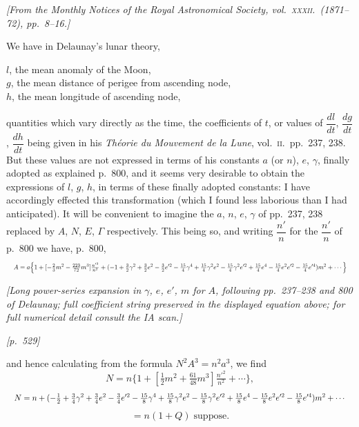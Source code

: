 \documentclass[11pt]{article}
\begin{document}
\medskip

\noindent\textit{[From the Monthly Notices of the Royal Astronomical
Society, vol.~\textsc{xxxii}.\ (1871--72), pp.~8--16.]}

\bigskip

We have in Delaunay's lunar theory,

\smallskip

\indent $l$, the mean anomaly of the Moon,\\
\indent $g$, the mean distance of perigee from ascending node,\\
\indent $h$, the mean longitude of ascending node,

\smallskip

quantities which vary directly as the time, the coefficients of $t$, or
values of $\dfrac{dl}{dt}$, $\dfrac{dg}{dt}$, $\dfrac{dh}{dt}$ being
given in his \textit{Th\'eorie du Mouvement de la Lune}, vol.~\textsc{ii}.\
pp.~237, 238. But these values are not expressed in terms of his
constants $a$ (or $n$), $e$, $\gamma$, finally adopted as explained
p.~800, and it seems very desirable to obtain the expressions of $l$,
$g$, $h$, in terms of these finally adopted constants: I have accordingly
effected this transformation (which I found less laborious than I had
anticipated). It will be convenient to imagine the $a$, $n$, $e$,
$\gamma$ of pp.~237, 238 replaced by $A$, $N$, $E$, $\Gamma$
respectively. This being so, and writing $\dfrac{n'}{n}$ for the
$\dfrac{n'}{n}$ of p.~800 we have, p.~800,
\[
\resizebox{\textwidth}{!}{$\displaystyle A=a\Big\{1+[-\tfrac{2}{3}m^2-\tfrac{223}{72}m^3]\tfrac{n'^2}{n^2}+(-1+\tfrac{3}{2}\gamma^2+\tfrac{3}{2}e^2-\tfrac{3}{2}e'^2-\tfrac{15}{4}\gamma^4+\tfrac{15}{4}\gamma^2 e^2-\tfrac{15}{4}\gamma^2 e'^2+\tfrac{15}{4}e^4-\tfrac{15}{4}e^2 e'^2-\tfrac{15}{4}e'^4)m^2+\cdots\Big\}$}
\]

\medskip

\textit{[Long power-series expansion in $\gamma$, $e$, $e'$, $m$ for $A$,
following pp.~237--238 and 800 of Delaunay; full coefficient string
preserved in the displayed equation above; for full numerical detail
consult the IA scan.]}


\newpage
\noindent\textit{[p.~529]}

\medskip

and hence calculating from the formula $N^2A^3=n^2a^3$, we find
\[
N=n\{1+[\tfrac{1}{2}m^2+\tfrac{61}{48}m^3]\tfrac{n'^2}{n^2}+\cdots\},
\]
\[
\resizebox{\textwidth}{!}{$\displaystyle N=n+(-\tfrac{1}{2}+\tfrac{3}{4}\gamma^2+\tfrac{3}{4}e^2-\tfrac{3}{4}e'^2-\tfrac{15}{8}\gamma^4+\tfrac{15}{8}\gamma^2e^2-\tfrac{15}{8}\gamma^2e'^2+\tfrac{15}{8}e^4-\tfrac{15}{8}e^2e'^2-\tfrac{15}{8}e'^4)m^2+\cdots$}
\]
\[
=n(1+Q)\;\text{suppose}.
\]
\end{document}
